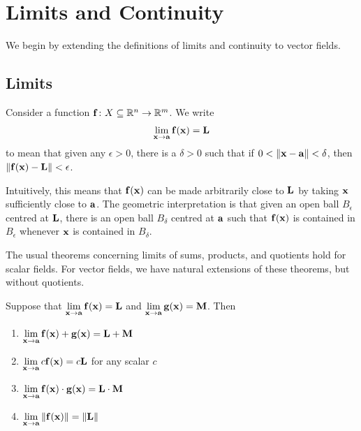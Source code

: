\documentclass{article}
\begin{document}
\section{Limits and Continuity}

We begin by extending the definitions of limits and continuity to vector fields.

\subsection{Limits}

\begin{definition}[Limit]
  Consider a function $\mathbf{f} \colon X \subseteq \mathbb{R}^n \to \mathbb{R}^m$.
  We write
  \begin{align}
    \lim_{\mathbf{x} \to \mathbf{a}} \mathbf{f}(\mathbf{x}) = \mathbf{L}
  \end{align}
  to mean that given any $\epsilon > 0$, there is a $\delta > 0$ such that if $0 < \norm{\mathbf{x} - \mathbf{a}} < \delta$, then $\norm{\mathbf{f}(\mathbf{x}) - \mathbf{L}} < \epsilon$.
\end{definition}
Intuitively, this means that $\mathbf{f}(\mathbf{x})$ can be made arbitrarily close to $\mathbf{L}$ by taking $\mathbf{x}$ sufficiently close to $\mathbf{a}$.
The geometric interpretation is that given an open ball $B_\epsilon$ centred at $\mathbf{L}$, there is an open ball $B_\delta$ centred at $\mathbf{a}$ such that $\mathbf{f}(\mathbf{x})$ is contained in $B_\epsilon$ whenever $\mathbf{x}$ is contained in $B_\delta$.

The usual theorems concerning limits of sums, products, and quotients hold for scalar fields.
For vector fields, we have natural extensions of these theorems, but without quotients.
\begin{theorem}
  Suppose that $\lim\limits_{\mathbf{x} \to \mathbf{a}} \mathbf{f}(\mathbf{x}) = \mathbf{L}$ and $\lim\limits_{\mathbf{x} \to \mathbf{a}} \mathbf{g}(\mathbf{x}) = \mathbf{M}$.
  Then
  \begin{enumerate}
    \item $\lim\limits_{\mathbf{x} \to \mathbf{a}} \mathbf{f}(\mathbf{x}) + \mathbf{g}(\mathbf{x}) = \mathbf{L} + \mathbf{M}$
    \item $\lim\limits_{\mathbf{x} \to \mathbf{a}} c\mathbf{f}(\mathbf{x}) = c\mathbf{L}$ for any scalar $c$
    \item $\lim\limits_{\mathbf{x} \to \mathbf{a}} \mathbf{f}(\mathbf{x}) \cdot \mathbf{g}(\mathbf{x}) = \mathbf{L} \cdot \mathbf{M}$
    \item $\lim\limits_{\mathbf{x} \to \mathbf{a}} \norm{\mathbf{f}(\mathbf{x})} = \norm{\mathbf{L}}$
  \end{enumerate}
\end{theorem}
\end{document}
